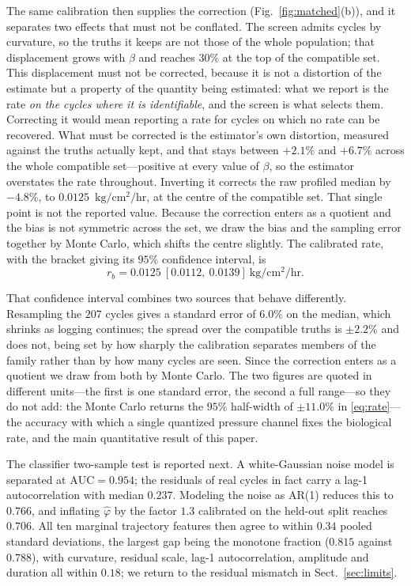 \documentclass[runningheads]{llncs}
\newcommand{\ratu}{\ensuremath{\mathrm{kg/cm^{2}/hr}}}
\newcommand{\rb}{\ensuremath{r_{b}}}
\begin{document}
The same calibration then supplies the correction
(Fig.~\ref{fig:matched}(b)), and it separates two effects that must not
be conflated. The screen admits cycles by curvature, so the truths it
keeps are not those of the whole population; that displacement grows
with $\beta$ and reaches $30\%$ at the top of the compatible set. This
displacement must not be corrected, because it is not a distortion of
the estimate but a property of the quantity being estimated: what we
report is the rate \emph{on the cycles where it is identifiable}, and
the screen is what selects them. Correcting it would mean reporting a
rate for cycles on which no rate can be recovered. What must be
corrected is the estimator's own distortion, measured against
the truths actually kept, and that stays between $+2.1\%$ and
$+6.7\%$ across the whole compatible set---positive at every value of
$\beta$, so the estimator overstates the rate throughout. Inverting it corrects the raw
profiled median by $-4.8\%$, to $0.0125$~\ratu{}, at the centre of the
compatible set. That single point is not the reported value. Because
the correction enters as a quotient and the bias is not symmetric
across the set, we draw the bias and the sampling error together by
Monte Carlo, which shifts the centre slightly. The calibrated rate,
with the bracket giving its $95\%$ confidence interval, is
\begin{equation}
\rb = 0.0125\ [0.0112,\ 0.0139]~\ratu{} .
\label{eq:rate}
\end{equation}

That confidence interval combines two sources that behave differently. Resampling
the $207$ cycles gives a standard error of $6.0\%$ on the median, which
shrinks as logging continues; the spread over the compatible truths is
$\pm 2.2\%$ and does not, being set by how sharply the calibration
separates members of the family rather than by how many cycles are
seen. Since the correction enters as a quotient we draw from both by
Monte Carlo. The two figures are quoted in different units---the first
is one standard error, the second a full range---so they do not add:
the Monte Carlo returns the $95\%$ half-width of $\pm 11.0\%$ in
\eqref{eq:rate}---the accuracy
with which a single quantized pressure channel fixes the biological
rate, and the main quantitative result of this paper.

The classifier two-sample test is reported next. A
white-Gaussian noise model is separated at $\mathrm{AUC}=0.954$; the
residuals of real cycles in fact carry a lag-1 autocorrelation with
median $0.237$. Modeling the noise as AR(1) reduces this to $0.766$,
and inflating $\hat{\varphi}$ by the factor $1.3$ calibrated on the
held-out split reaches $0.706$. All ten marginal trajectory features
then agree to within $0.34$ pooled standard deviations, the largest gap
being the monotone fraction ($0.815$ against $0.788$), with curvature,
residual scale, lag-1 autocorrelation, amplitude and duration all
within $0.18$; we return to the residual mismatch in
Sect.~\ref{sec:limits}.
\end{document}
